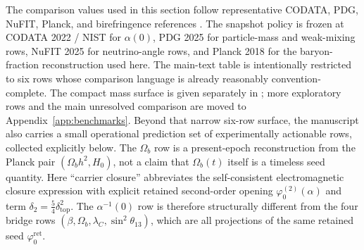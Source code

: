 \documentclass[11pt,a4paper]{article}
\theoremstyle{definition}
\theoremstyle{remark}
\newcommand{\phiz}{\varphi_0^{\mathrm{ret}}}
\newcommand{\phiztwo}{\varphi_0^{(2)}}
\newcommand{\deltatop}{\delta_{\mathrm{top}}}
\begin{document}
The comparison values used in this section follow representative CODATA, PDG, NuFIT, Planck, and birefringence references \cite{codata2022,pdg2025,nufit2025,planck2018,minamiKomatsu2020,eskilt2023,sullivan2025}. The snapshot policy is frozen at CODATA 2022 / NIST for $\alpha(0)$, PDG 2025 for particle-mass and weak-mixing rows, NuFIT 2025 for neutrino-angle rows, and Planck 2018 for the baryon-fraction reconstruction used here. The main-text table is intentionally restricted to six rows whose comparison language is already reasonably convention-complete. The compact mass surface is given separately in ; more exploratory rows and the main unresolved comparison are moved to Appendix~\ref{app:benchmarks}. Beyond that narrow six-row surface, the manuscript also carries a small operational prediction set of experimentally actionable rows, collected explicitly below. The $\Omega_b$ row is a present-epoch reconstruction from the Planck pair $(\Omega_b h^2,H_0)$, not a claim that $\Omega_b(t)$ itself is a timeless seed quantity.
Here \enquote{carrier closure} abbreviates the self-consistent electromagnetic closure expression with explicit retained second-order opening $\phiztwo(\alpha)$ and term $\delta_2=\frac54\deltatop^2$. The $\alpha^{-1}(0)$ row is therefore structurally different from the four bridge rows $(\beta,\Omega_b,\lambda_C,\sin^2\theta_{13})$, which are all projections of the same retained seed $\phiz$.
\end{document}
